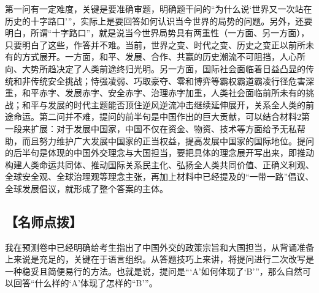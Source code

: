 \documentclass[UTF8,11pt]{ctexart}
\begin{document}
第一问有一定难度，关键是要准确审题，明确题干问的“为什么说‘世界又一次站在历史的十字路口’”，实际上是要回答如何认识当今世界的局势的问题。另外，还要明白，所谓“十字路口”，就是说当今世界局势具有两重性（一方面、另一方面），只要明白了这些，作答并不难。当前，世界之变、时代之变、历史之变正以前所未有的方式展开。一方面，和平、发展、合作、共赢的历史潮流不可阻挡，人心所向、大势所趋决定了人类前途终归光明。另一方面，国际社会面临着日益凸显的传统和非传统安全挑战；恃强凌弱、巧取豪夺、零和博弈等霸权霸道霸凌行径危害深重，和平赤字、发展赤字、安全赤字、治理赤字加重，人类社会面临前所未有的挑战；和平与发展的时代主题能否顶住逆风逆流冲击继续延伸展开，关系全人类的前途命运。第二问并不难，提问的前半句是中国作出的巨大贡献，可以结合材料2第一段来扩展：对于发展中国家，中国不仅在资金、物资、技术等方面给予无私帮助，而且努力维护广大发展中国家的正当权益，提高发展中国家的国际地位。提问的后半句是体现的中国外交理念与大国担当，要把具体的理念展开写出来，即推动构建人类命运共同体、推动国际关系民主化、弘扬全人类共同价值、正确义利观、全球安全观、全球治理观等理念主张，再加上材料中已经提及的“一带一路”倡议、全球发展倡议，就形成了整个答案的主体。


\subsection*{【名师点拨】}

我在预测卷中已经明确给考生指出了中国外交的政策宗旨和大国担当，从背诵准备上来说是充足的，关键在于语言组织。从答题技巧上来讲，将提问进行二次改写是一种稳妥且简便易行的方法。也就是说，提问是“‘A’如何体现了‘B’”，那么自然可以回答“什么样的‘A’体现了怎样的“B’”。
\end{document}
